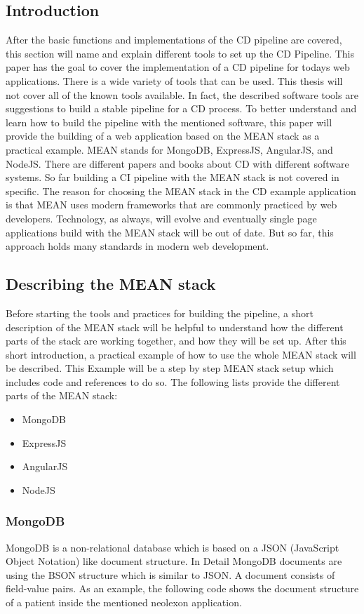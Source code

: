 \subsection{Introduction}
After the basic functions and implementations of the CD pipeline are covered, this section will name and explain different tools
to set up the CD Pipeline. This paper has the goal to cover the implementation of a CD pipeline for todays web applications. There is a wide variety
of tools that can be used. This thesis will not cover all of the known tools available. In fact, the described software tools are suggestions to build a
stable pipeline for a CD process. To better understand and learn how to build the pipeline with the mentioned software, this paper will provide the building
of a web application based on the MEAN stack as a practical example. MEAN stands for MongoDB, ExpressJS, AngularJS, and NodeJS. There are different papers and
books about CD with different software systems. So far building a CI pipeline with the MEAN stack is not covered in specific.
The reason for choosing the MEAN stack in the CD example application is that MEAN uses modern frameworks that are commonly practiced by web developers.
Technology, as always, will evolve and eventually single page applications build with the MEAN stack will be out of date. But so far, this approach holds many
standards in modern web development.

\subsection{Describing the MEAN stack}
Before starting the tools and practices for building the pipeline, a short description of the MEAN stack will be helpful to understand how the different parts of the
stack are working together, and how they will be set up. After this short introduction, a practical example of how to use the whole MEAN stack will be described.
This Example will be a step by step MEAN stack setup which includes code and references to do so. The following lists provide the different parts of the MEAN stack:

\begin{itemize}
  \item MongoDB
  \item ExpressJS
  \item AngularJS
  \item NodeJS
\end{itemize}

\subsubsection{MongoDB}
MongoDB is a non-relational database which is based on a JSON (JavaScript Object Notation) like document structure. In Detail MongoDB documents are using the BSON structure
which is similar to JSON. A document consists of field-value pairs. As an example, the following code shows the document structure of a patient inside the mentioned neolexon application.

